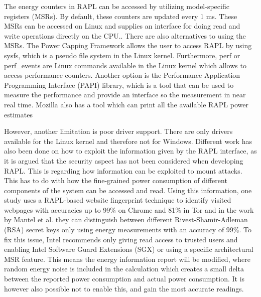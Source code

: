 



The energy counters in RAPL can be accessed by utilizing model-specific registers (MSRs). By default, these counters are updated every 1 ms. These MSRs can be accessed on Linux and supplies an interface for doing read and write operations directly on the CPU.\cite{linux_manual_msr}. There are also alternatives to using the MSRs. The Power Capping Framework allows the user to access RAPL by using sysfs, which is a pseudo file system in the Linux kernel\cite{PowerCappingFramework,RAPL_in_action}. Furthermore, perf or perf\_events are Linux commands available in the Linux kernel which allows to access performance counters.\cite{Perf_events,RAPL_in_action} 
Another option is the Performance Application Programming Interface (PAPI) library, which is a tool that can be used to measure the performance and provide an interface so the measurement in near real time\cite{PAPI}.
Mozilla also has a tool which can print all the available RAPL power estimates\cite{FireFox}\nytafsnit



However, another limitation is poor driver support. There are only drivers available for the Linux kernel and therefore not for Windows.\cite{RAPL_in_action}  Different work has also been done on how to exploit the information given by the RAPL interface, as it is argued that the security aspect has not been considered when developing RAPL\cite[]{Zhang2021}. This is regarding how information can be exploited to mount attacks. This has to do with how the fine-grained power consumption of different components of the system can be accessed and read. Using this information, one study uses a RAPL-based website fingerprint technique to identify visited webpages with accuracies up to 99\% on Chrome and 81\% in Tor\cite[]{Zhang2021} and in the work by Mantel et al.\cite[]{Mantel2018} they can distinguish between different Rivest-Shamir-Adleman (RSA) secret keys only using energy measurements with an accuracy of 99\%. To fix this issue, Intel recommends only giving read access to trusted users and enabling Intel Software Guard Extensions (SGX) or using a specific architectural MSR feature. This means the energy information report will be modified, where random energy noise is included in the calculation which creates a small delta between the reported power consumption and actual power consumption. It is however also possible not to enable this, and gain the most accurate readings.\cite[]{intel_rapl_security}

